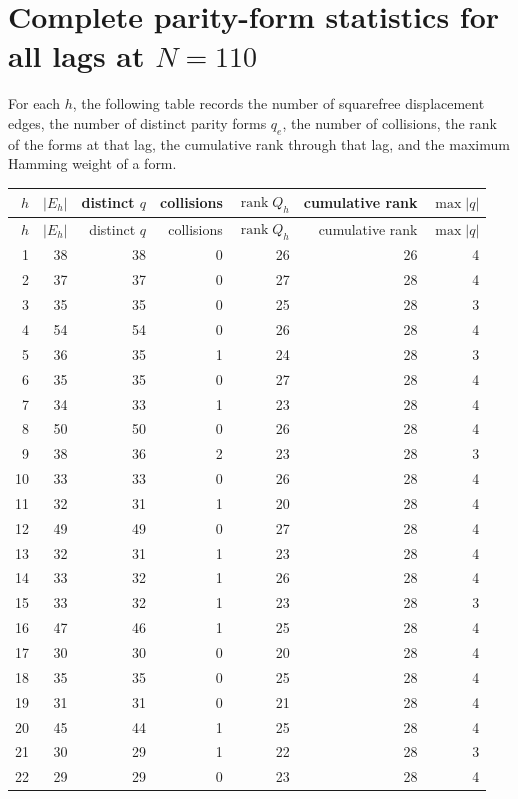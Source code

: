 \documentclass[11pt]{article}
\begin{document}
\section{Complete parity-form statistics for all lags at $N=110$}

For each $h$, the following table records the number of squarefree displacement edges, the number of distinct parity forms $q_e$, the number of collisions, the rank of the forms at that lag, the cumulative rank through that lag, and the maximum Hamming weight of a form.
\begin{center}\scriptsize
\begin{longtable}{r r r r r r r}
\toprule $h$ & $|E_h|$ & distinct $q$ & collisions & $\operatorname{rank}Q_h$ & cumulative rank & $\max|q|$\\
\midrule\endfirsthead
\toprule $h$ & $|E_h|$ & distinct $q$ & collisions & $\operatorname{rank}Q_h$ & cumulative rank & $\max|q|$\\
\midrule\endhead
1 & 38 & 38 & 0 & 26 & 26 & 4\\
2 & 37 & 37 & 0 & 27 & 28 & 4\\
3 & 35 & 35 & 0 & 25 & 28 & 3\\
4 & 54 & 54 & 0 & 26 & 28 & 4\\
5 & 36 & 35 & 1 & 24 & 28 & 3\\
6 & 35 & 35 & 0 & 27 & 28 & 4\\
7 & 34 & 33 & 1 & 23 & 28 & 4\\
8 & 50 & 50 & 0 & 26 & 28 & 4\\
9 & 38 & 36 & 2 & 23 & 28 & 3\\
10 & 33 & 33 & 0 & 26 & 28 & 4\\
11 & 32 & 31 & 1 & 20 & 28 & 4\\
12 & 49 & 49 & 0 & 27 & 28 & 4\\
13 & 32 & 31 & 1 & 23 & 28 & 4\\
14 & 33 & 32 & 1 & 26 & 28 & 4\\
15 & 33 & 32 & 1 & 23 & 28 & 3\\
16 & 47 & 46 & 1 & 25 & 28 & 4\\
17 & 30 & 30 & 0 & 20 & 28 & 4\\
18 & 35 & 35 & 0 & 25 & 28 & 4\\
19 & 31 & 31 & 0 & 21 & 28 & 4\\
20 & 45 & 44 & 1 & 25 & 28 & 4\\
21 & 30 & 29 & 1 & 22 & 28 & 3\\
22 & 29 & 29 & 0 & 23 & 28 & 4\\

\end{longtable}
\end{center}
\end{document}
